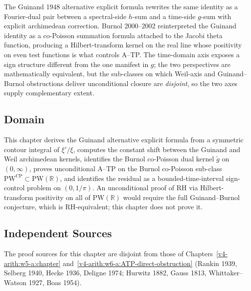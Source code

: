The Guinand 1948 alternative explicit formula rewrites the same
identity as a Fourier-dual pair between a spectral-side \(h\)-sum
and a time-side \(g\)-sum with explicit archimedean correction.
Burnol 2000--2002 reinterpreted the Guinand identity as a co-Poisson
summation formula attached to the Jacobi theta function, producing a
Hilbert-transform kernel on the real line whose positivity on even
test functions is what controls A--TP. The time-domain axis exposes a
sign structure different from the one manifest in \(g\); the two
perspectives are mathematically equivalent, but the sub-classes on
which Weil-axis and Guinand--Burnol obstructions deliver unconditional
closure are \emph{disjoint}, so the two axes supply complementary
extent.

\subsection{Domain}
\label{v4-arith:w7-i:domain}

This chapter derives the Guinand alternative explicit formula from a
symmetric contour integral of \(\xi'/\xi\), computes the constant
shift between the Guinand and Weil archimedean kernels, identifies
the Burnol co-Poisson dual kernel \(\widetilde g\) on \((0,\infty)\),
proves unconditional A--TP on the Burnol co-Poisson sub-class
\(\mathrm{PW}^{\mathrm{CP}}\subset\mathrm{PW}(\mathbb{R})\), and
identifies the residual as a bounded-time-interval sign-control
problem on \((0,1/\pi)\). An unconditional proof of RH via
Hilbert-transform positivity on all of \(\mathrm{PW}(\mathbb{R})\)
would require the full Guinand--Burnol conjecture, which is
RH-equivalent; this chapter does not prove it.

\subsection{Independent Sources}
\label{v4-arith:w7-i:sources}

The proof sources for this chapter are disjoint from those of
Chapters~\ref{v4-arith:w5-a:chapter} and~\ref{v4-arith:w6-a:ATP-direct-obstruction}
(Rankin 1939, Selberg 1940, Hecke 1936, Deligne 1974; Hurwitz 1882,
Gauss 1813, Whittaker--Watson 1927, Boas 1954).

